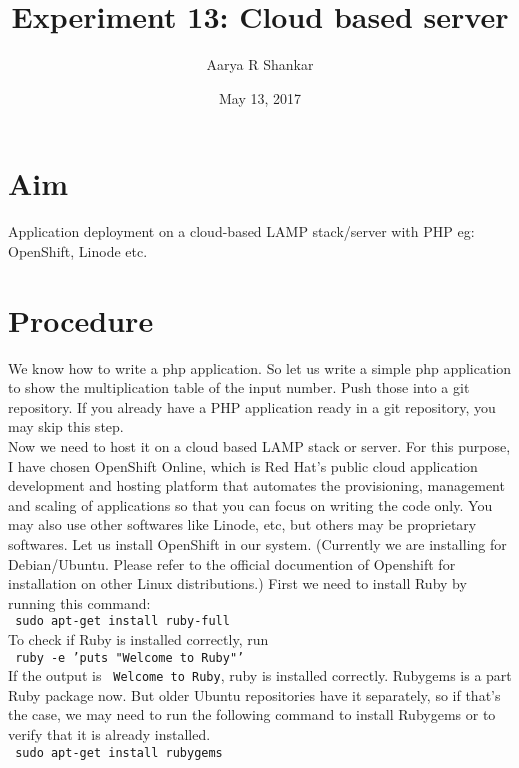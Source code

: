 \documentclass[12pt,a4paper]{article}
\title{Experiment 13: Cloud based server}
\author{Aarya R Shankar}
\date{May 13, 2017}
\begin{document}
\maketitle
\section{Aim}
 
Application deployment on a cloud-based LAMP stack/server with PHP eg: OpenShift, Linode etc.

\section{Procedure}

We know how to write a php application. So let us write a simple php application to show the multiplication table of the input number. Push those into a git repository. If you already have a PHP application ready in a git repository, you may skip this step.\\
Now we need to host it on a cloud based LAMP stack or server. For this purpose, I have chosen OpenShift Online, which is Red Hat’s public cloud application development and hosting platform that automates the provisioning, management and scaling of applications so that you can focus on writing the code only. You may also use other softwares like Linode, etc, but others may be proprietary softwares. Let us install OpenShift in our system. (Currently we are installing for Debian/Ubuntu. Please refer to the official documention of Openshift for installation on other Linux distributions.) First we need to install Ruby by running this command:\\
\newline
\texttt{\ sudo apt-get install ruby-full}\\
\newline
To check if Ruby is installed correctly, run \\
\newline
\texttt{\ ruby -e 'puts "Welcome to Ruby"'}\\
\newline
If the output is \texttt{\ Welcome to Ruby}, ruby is installed correctly. Rubygems is a part Ruby package now. But older Ubuntu repositories have it separately, so if that's the case, we may need to run the following command to install Rubygems or to verify that it is already installed.\\
\newline
\texttt{\ sudo apt-get install rubygems}\\
\end{document}

